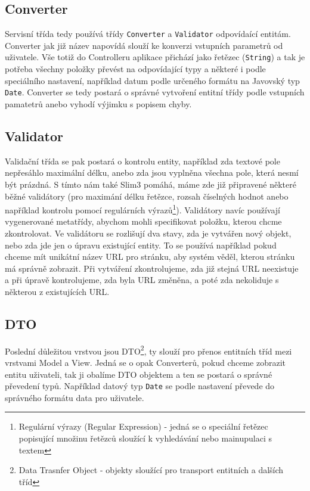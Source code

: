 \subsection{Converter}
Servisní třída tedy používá třídy \verb|Converter| a \verb|Validator| odpovídaící entitám. Converter jak již název napovídá slouží ke konverzi vstupních parametrů od uživatele. Vše totiž do Controlleru aplikace přichází jako řetězec (\verb|String|) a tak je potřeba všechny položky převést na odpovídající typy a některé i podle speciálního nastavení, například datum podle určeného formátu na Javovský typ \verb|Date|. Converter se tedy postará o správné vytvoření entitní třídy podle vstupních pamatetrů anebo vyhodí výjimku s popisem chyby. 

\subsection{Validator}
Validační třída se pak postará o kontrolu entity, například zda textové pole nepřesáhlo maximální délku, anebo zda jsou vyplněna všechna pole, která nesmí být prázdná. S tímto nám také Slim3 pomáhá, máme zde již připravené některé běžné validátory (pro maximání délku řetězce, rozsah číselných hodnot anebo například kontrolu pomocí regulárních výrazů\footnote{Regulární výrazy (Regular Expression) - jedná se o speciální řetězec popisující množinu řetězců sloužící k vyhledávání nebo mainupulaci s textem}). Validátory navíc používají vygenerované metatřídy, abychom mohli specifikovat položku, kterou chcme zkontrolovat. Ve validátoru se rozlišují dva stavy, zda je vytvářen nový objekt, nebo zda jde jen o úpravu existující entity. To se používá například pokud chceme mít unikátní název URL pro stránku, aby systém věděl, kterou stránku má správně zobrazit. Při vytváření zkontrolujeme, zda již stejná URL neexistuje a při úpravě kontrolujeme, zda byla URL změněna, a poté zda nekoliduje s některou z existujících URL. 

\subsection{DTO}
Poslední důležitou vrstvou jsou DTO\footnote{Data Trasnfer Object - objekty sloužící pro transport entitních a dalších tříd}, ty slouží pro přenos entitních tříd mezi vrstvami Model a View. Jedná se o opak Converterů, pokud chceme zobrazit entitu uživateli, tak ji obalíme DTO objektem a ten se postará o správné převedení typů. Například datový typ \verb|Date| se podle nastavení převede do správného formátu data pro uživatele. 

